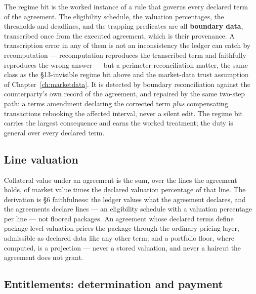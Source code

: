 \medskip
The regime bit is the worked instance of a rule that governs every declared term of the
agreement. The eligibility schedule, the valuation percentages, the thresholds and
deadlines, and the trapping predicates are all \textbf{boundary data}, transcribed once
from the executed agreement, which is their provenance. A transcription error in any of
them is not an inconsistency the ledger can catch by recomputation --- recomputation
reproduces the transcribed term and faithfully reproduces the wrong answer --- but a
perimeter-reconciliation matter, the same class as the \S13-invisible regime bit above
and the market-data trust assumption of Chapter~\ref{ch:marketdata}. It is detected by
boundary reconciliation against the counterparty's own record of the agreement, and
repaired by the same two-step path: a terms amendment declaring the corrected term
\emph{plus} compensating transactions rebooking the affected interval, never a silent
edit. The regime bit carries the largest consequence and earns the worked treatment;
the duty is general over every declared term.

\subsection{Line valuation}

Collateral value under an agreement is the sum, over the lines the agreement
holds, of market value times the declared valuation percentage of that line.
The derivation is \S6 faithfulness: the ledger values what the agreement
declares, and the agreements declare lines --- an eligibility schedule with a
valuation percentage per line --- not floored packages. An agreement whose
declared terms define package-level valuation prices the package through the
ordinary pricing layer, admissible as declared data like any other term; and a
portfolio floor, where computed, is a projection --- never a stored valuation,
and never a haircut the agreement does not grant.

\subsection{Entitlements: determination and payment}

